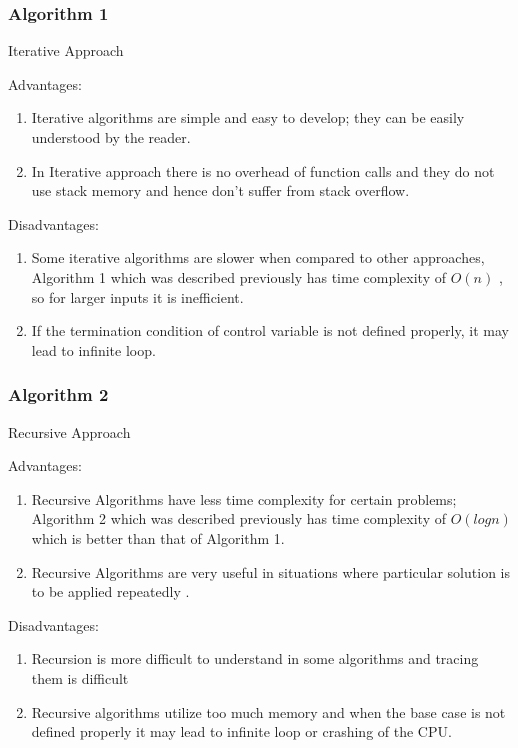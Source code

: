 \documentclass[12pt, a4paper]{article}
\begin{document}
\subsubsection{Algorithm 1}
Iterative Approach

Advantages:
\begin{enumerate}
    \item {Iterative algorithms are simple and easy to develop; they can be easily understood by the reader.}
    \item {In Iterative approach there is no overhead of function calls and they do not use stack memory and hence don’t suffer from stack overflow.}
    
\end{enumerate}

Disadvantages:
\begin{enumerate}
    \item {Some iterative algorithms are slower when compared to other approaches, Algorithm 1 which was described previously has time complexity of $O(n)$ , so for larger inputs it is inefficient.}
    \item {If the termination condition of control variable is not defined properly, it may lead to infinite loop.}
    
\end{enumerate}
\newpage
\subsubsection{Algorithm 2}
Recursive Approach 

Advantages:
\begin{enumerate}
    \item {Recursive Algorithms have less time complexity for certain problems;  Algorithm 2 which was described previously has time complexity of $O(logn)$ which is better than that of Algorithm 1.}
    \item {Recursive Algorithms are very useful in situations where particular solution is to be applied repeatedly \cite{Advantages and Disadvantages of Recursion}.}
    
\end{enumerate}

Disadvantages:
\begin{enumerate}
    \item {Recursion is more difficult to understand in some algorithms and tracing them is difficult}
    \item {Recursive algorithms utilize too much memory and when the base case is not defined properly it may lead to infinite loop or crashing of the CPU.}
    
\end{enumerate}
\end{document}
